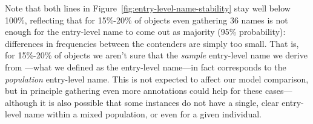 Note that both lines in Figure~\ref{fig:entry-level-name-stability} stay well below 100\%, reflecting that for 15\%-20\% of objects even gathering 36 names is not enough for the entry-level name to come out as majority (95\% probability): differences in frequencies between the contenders are simply too small.
That is, for 15\%-20\% of objects we aren't sure that the \emph{sample} entry-level name we derive from \mn---what we defined as the entry-level name---in fact corresponds to the \emph{population} entry-level name.
This is not expected to affect our model comparison, but in principle gathering even more annotations could help for these cases---although it is also possible that some instances do not have a single, clear entry-level name within a mixed population, or even for a given individual.



